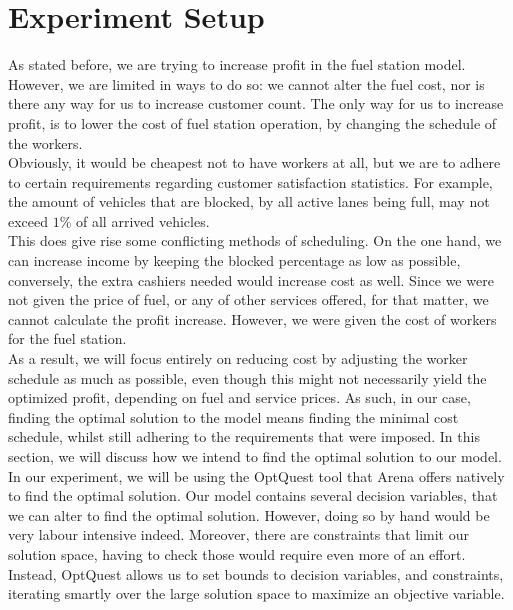 \section{Experiment Setup}
As stated before, we are trying to increase profit in the fuel station model.
However, we are limited in ways to do so: we cannot alter the fuel cost, nor is there any way for us to increase customer count.
The only way for us to increase profit, is to lower the cost of fuel station operation, by changing the schedule of the workers. \\
Obviously, it would be cheapest not to have workers at all, but we are to adhere to certain requirements regarding customer satisfaction statistics.
For example, the amount of vehicles that are blocked, by all active lanes being full, may not exceed $1\%$ of all arrived vehicles. \\
This does give rise some conflicting methods of scheduling.
On the one hand, we can increase income by keeping the blocked percentage as low as possible, conversely, the extra cashiers needed would increase cost as well.
Since we were not given the price of fuel, or any of other services offered, for that matter, we cannot calculate the profit increase.
However, we were given the cost of workers for the fuel station. \\
As a result, we will focus entirely on reducing cost by adjusting the worker schedule as much as possible, even though this might not necessarily yield the optimized profit, depending on fuel and service prices.
As such, in our case, finding the optimal solution to the model means finding the minimal cost schedule, whilst still adhering to the requirements that were imposed.
In this section, we will discuss how we intend to find the optimal solution to our model. \\

In our experiment, we will be using the OptQuest tool that Arena offers natively to find the optimal solution.
Our model contains several decision variables, that we can alter to find the optimal solution.
However, doing so by hand would be very labour intensive indeed.
Moreover, there are constraints that limit our solution space, having to check those would require even more of an effort.
Instead, OptQuest allows us to set bounds to decision variables, and constraints, iterating smartly over the large solution space to maximize an objective variable. \\

